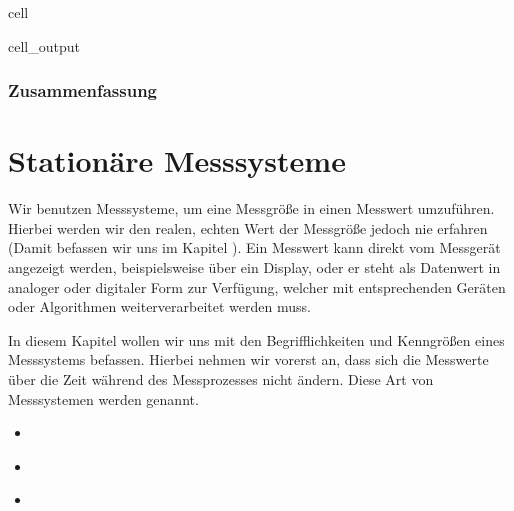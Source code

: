 \documentclass[letterpaper,10pt,english]{jupyterBook}
\begin{document}
\begin{sphinxuseclass}{cell}
\begin{sphinxVerbatimOutput}
\begin{sphinxuseclass}{cell_output}
\noindent{}

\end{sphinxuseclass}\end{sphinxVerbatimOutput}

\end{sphinxuseclass}

\subsection{Zusammenfassung }
\label{\detokenize{content/1_Kurvenanpassung:zusammenfassung-a-id-sec-zusammenfassung-a}}
\sphinxAtStartPar
{}

\sphinxstepscope


\chapter{Stationäre Messsysteme}
\label{\detokenize{content/2_Stationaer:stationare-messsysteme}}\label{\detokenize{content/2_Stationaer::doc}}
\sphinxAtStartPar
Wir benutzen Messsysteme, um eine Messgröße in einen Messwert umzuführen. Hierbei werden wir den realen, echten Wert der Messgröße jedoch nie erfahren (Damit befassen wir uns im Kapitel  {\hyperref[\detokenize{content/1_Messunsicherheiten::doc}]{}}).
Ein Messwert kann direkt vom Messgerät angezeigt werden, beispielsweise über ein Display, oder er steht als Datenwert in analoger oder digitaler Form zur Verfügung, welcher mit entsprechenden Geräten oder Algorithmen weiterverarbeitet werden muss.

\sphinxAtStartPar
In diesem Kapitel wollen wir uns mit den Begrifflichkeiten und Kenngrößen eines Messsystems befassen. Hierbei nehmen wir vorerst an, dass sich die Messwerte über die Zeit während des Messprozesses nicht ändern. Diese Art von Messsystemen werden  genannt.
\begin{itemize}
\item {} 
\sphinxAtStartPar
{\hyperref[\detokenize{content/2_Messsystem::doc}]{}}

\item {} 
\sphinxAtStartPar
{\hyperref[\detokenize{content/2_idealeKennlinie::doc}]{}}

\item {} 
\sphinxAtStartPar
{\hyperref[\detokenize{content/2_realeKennlinie::doc}]{}}

\end{itemize}
\end{document}
